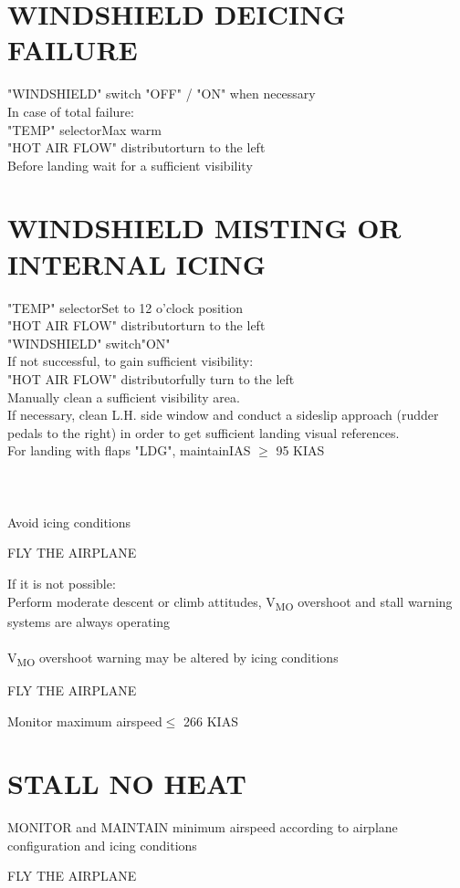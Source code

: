 \documentclass{article}
\newcommand{\fly}{\vspace{-1em}\begin{center}\color{Green}FLY THE AIRPLANE\end{center}\vspace{-1em}}
\newcommand{\warning}[1]{\colorbox{Black}{\color{Orange}{#1}}}
\begin{document}
\begin{multicols*}{2}
\section*{WINDSHIELD DEICING FAILURE}
"WINDSHIELD" switch \dotfill "OFF" / "ON" when necessary\\
In case of total failure:\\
"TEMP" selector\dotfill Max warm\\
"HOT AIR FLOW" distributor\dotfill turn to the left\\
Before landing wait for a sufficient visibility
\section*{WINDSHIELD MISTING OR INTERNAL ICING}
"TEMP" selector\dotfill Set to 12 o'clock position\\
"HOT AIR FLOW" distributor\dotfill turn to the left\\
"WINDSHIELD" switch\dotfill "ON"\\
If not successful, to gain sufficient visibility:\\
"HOT AIR FLOW" distributor\dotfill fully turn to the left\\
Manually clean a sufficient visibility area.\\
If necessary, clean L.H. side window and conduct a sideslip approach (rudder pedals to the right) in order to get sufficient landing visual references.\\
For landing with flaps "LDG", maintain\dotfill IAS $\geq$ 95 KIAS
\section*{\color{Orange}{PITOT NO HT L-R}}
\warning{PITOT NO HT L}\\
Avoid icing conditions
\fly
If it is not possible:\\
Perform moderate descent or climb attitudes, V\textsubscript{MO} overshoot and stall warning systems are always operating\\
\warning{PITOT NO HT R}\\
V\textsubscript{MO} overshoot warning may be altered by icing conditions

\fly
Monitor maximum airspeed\dotfill $\leq$ 266 KIAS
\section*{STALL NO HEAT}
MONITOR and MAINTAIN minimum airspeed according to airplane configuration and icing conditions
\fly

\end{multicols*}
\end{document}
